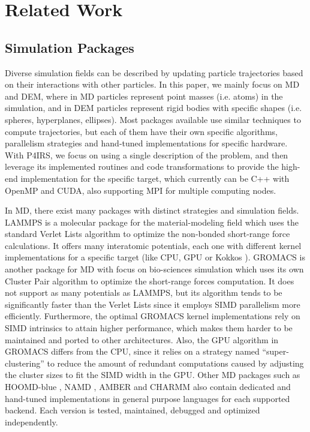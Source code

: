\documentclass[preprint,12pt]{elsarticle}
\begin{document}
\section{Related Work}
\label{sec:related_work}

\subsection{Simulation Packages}
\label{sec:packages}

Diverse simulation fields can be described by updating particle trajectories based on their interactions with other particles.
In this paper, we mainly focus on \ac{MD} and \ac{DEM}, where in MD particles represent point masses (i.e. atoms) in the simulation, and in \ac{DEM} particles represent rigid bodies with specific shapes (i.e. spheres, hyperplanes, ellipses).
Most packages available use similar techniques to compute trajectories, but each of them have their own specific algorithms, parallelism strategies and hand-tuned implementations for specific hardware.
With P4IRS, we focus on using a single description of the problem, and then leverage its implemented routines and code transformations to provide the high-end implementation for the specific target, which currently can be C++ with OpenMP and CUDA, also supporting MPI for multiple computing nodes.

In MD, there exist many packages with distinct strategies and simulation fields.
LAMMPS \cite{lammps1,lammps2} is a molecular package for the material-modeling field which uses the standard Verlet Lists algorithm to optimize the non-bonded short-range force calculations.
It offers many interatomic potentials, each one with different kernel implementations for a specific target (like CPU, GPU or Kokkos \cite{kokkos}).
GROMACS \cite{gromacs1,gromacs2} is another package for MD with focus on bio-sciences simulation which uses its own Cluster Pair algorithm to optimize the short-range forces computation.
It does not support as many potentials as LAMMPS, but its algorithm tends to be significantly faster than the Verlet Lists since it employs SIMD parallelism more efficiently.
Furthermore, the optimal GROMACS kernel implementations rely on SIMD intrinsics to attain higher performance, which makes them harder to be maintained and ported to other architectures.
Also, the GPU algorithm in GROMACS differs from the CPU, since it relies on a strategy named ``super-clustering'' to reduce the amount of redundant computations caused by adjusting the cluster sizes to fit the SIMD width in the GPU.
Other MD packages such as HOOMD-blue \cite{hoomdblue}, NAMD \cite{namd}, AMBER \cite{amber1,amber2} and CHARMM \cite{charmm} also contain dedicated and hand-tuned implementations in general purpose languages for each supported backend.
Each version is tested, maintained, debugged and optimized independently.
\end{document}
